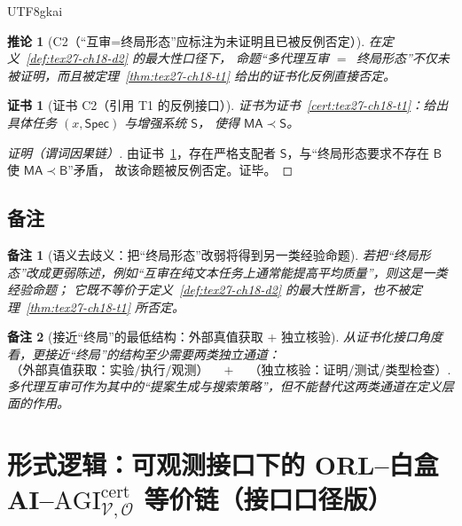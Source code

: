 \documentclass[12pt]{article}
\newtheorem{corollary}{推论}[section]
\newtheorem{remark}{备注}[section]
\newtheorem{Certificate}{证书}[section]
\begin{document}
\begin{CJK*}{UTF8}{gkai}
\begin{corollary}[C2（“互审=终局形态”应标注为未证明且已被反例否定）]
\label{cor:tex27-ch18-c2}
在定义~\ref{def:tex27-ch18-d2} 的最大性口径下，
命题“多代理互审 $=\,$ 终局形态”不仅未被证明，而且被定理~\ref{thm:tex27-ch18-t1} 给出的证书化反例直接否定。
\end{corollary}

\begin{Certificate}[证书 C2（引用 T1 的反例接口）]
\label{cert:tex27-ch18-c2}
证书为证书~\ref{cert:tex27-ch18-t1}：给出具体任务 $(x,\mathsf{Spec})$ 与增强系统 $\mathsf{S}$，
使得 $\mathsf{MA}\prec \mathsf{S}$。
\end{Certificate}

\begin{proof}[证明（谓词因果链）]
由证书~\ref{cert:tex27-ch18-c2}，存在严格支配者 $\mathsf{S}$，与“终局形态要求不存在 $\mathsf{B}$ 使 $\mathsf{MA}\prec \mathsf{B}$”矛盾，
故该命题被反例否定。证毕。
\end{proof}

\subsection{备注}
\label{subsec:tex27-ch18-remarks}

\begin{remark}[语义去歧义：把“终局形态”改弱将得到另一类经验命题]
\label{rem:tex27-ch18-r1}
若把“终局形态”改成更弱陈述，例如“互审在纯文本任务上通常能提高平均质量”，则这是一类经验命题；
它既不等价于定义~\ref{def:tex27-ch18-d2} 的最大性断言，也不被定理~\ref{thm:tex27-ch18-t1} 所否定。
\end{remark}

\begin{remark}[接近“终局”的最低结构：外部真值获取 + 独立核验]
\label{rem:tex27-ch18-r2}
从证书化接口角度看，更接近“终局”的结构至少需要两类独立通道：
\[
  \text{（外部真值获取：实验/执行/观测）}\quad+\quad\text{（独立核验：证明/测试/类型检查）}.
\]
多代理互审可作为其中的“提案生成与搜索策略”，但不能替代这两类通道在定义层面的作用。
\end{remark}

\clearpage

\section{形式逻辑：可观测接口下的 ORL--白盒 AI--\texorpdfstring{$\mathrm{AGI}^{\mathrm{cert}}_{\mathcal{V},\mathcal{O}}$}{AGIcert(V,O)}
  等价链（接口口径版）}
\label{sec:tex27-ch19-formal-interface-orl-whitebox-agi}


\end{CJK*}
\end{document}
